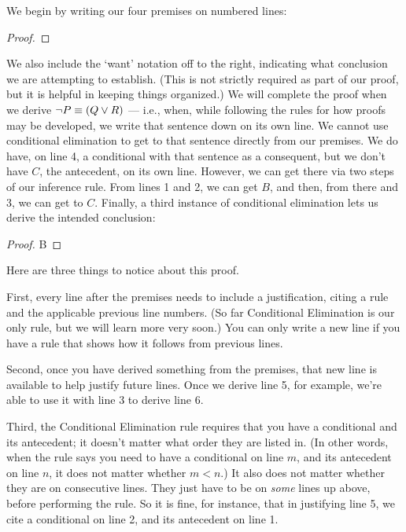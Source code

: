 We begin by writing our four premises on numbered lines:

\begin{proof}
	 
\end{proof}

We also include the `want' notation off to the right, indicating what conclusion we are attempting to establish. (This is not strictly required as part of our proof, but it is helpful in keeping things organized.) We will complete the proof when we derive $\neg P \equiv (Q \vee R)$ --- i.e., when, while following the rules for how proofs may be developed, we write that sentence down on its own line. We cannot use conditional elimination to get to that sentence directly from our premises. We do have, on line 4, a conditional with that sentence as a consequent, but we don't have $C$, the antecedent, on its own line. However, we can get there via two steps of our inference rule. From lines 1 and 2, we can get $B$, and then, from there and 3, we can get to $C$. Finally, a third instance of conditional elimination lets us derive the intended conclusion:

\begin{proof}
	 
	 {B} 
	 
	 
\end{proof}

Here are three things to notice about this proof.

First, every line after the premises needs to include a justification, citing a rule and the applicable previous line numbers. (So far Conditional Elimination is our only rule, but we will learn more very soon.) You can only write a new line if you have a rule that shows how it follows from previous lines.

Second, once you have derived something from the premises, that new line is available to help justify future lines. Once we derive line 5, for example, we're able to use it with line 3 to derive line 6.

Third, the Conditional Elimination rule requires that you have a conditional and its antecedent; it doesn't matter what order they are listed in. (In other words, when the rule says you need to have a conditional on line $m$, and its antecedent on line $n$, it does not matter whether $m<n$.) It also does not matter whether they are on consecutive lines. They just have to be on \emph{some} lines up above, before performing the rule.  So it is fine, for instance, that in justifying line 5, we cite a conditional on line 2, and its antecedent on line 1.

